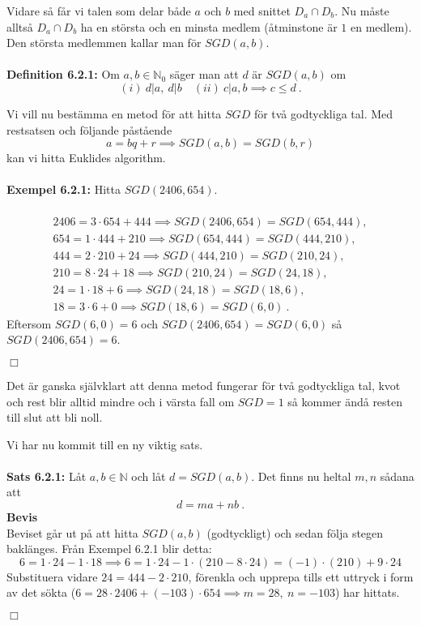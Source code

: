\documentclass{article}
\begin{document}
Vidare så får vi talen som delar både $a$ och $b$ med snittet $D_a\cap D_b$. Nu måste alltså $D_a\cap D_b$ ha en största och en minsta medlem (åtminstone är $1$ en medlem). Den största medlemmen kallar man för $SGD(a,b)$.\\ \\
\textbf{Definition 6.2.1:} Om $a,b\in\mathbb{N}_0$ säger man att $d$ är $SGD(a,b)$ om
$$
(i) \ d|a, \ d|b \quad (ii) \  c|a,b\implies c\leq d \ .
$$

Vi vill nu bestämma en metod för att hitta $SGD$ för två godtyckliga tal. Med restsatsen och följande påstående
$$
a=bq+r\implies SGD(a,b)=SGD(b,r)
$$
kan vi hitta Euklides algorithm.\\ \\
\textbf{Exempel 6.2.1:} Hitta $SGD(2406,654)$.\\ \\
\begin{equation*}
    \begin{split}
        2406=3\cdot654+444 \implies SGD(2406,654)=SGD(654,444), \\
        654=1\cdot444+210 \implies SGD(654,444)=SGD(444,210), \\
        444=2\cdot210+24\implies SGD(444,210)=SGD(210,24), \\
        210=8\cdot24+18 \implies SGD(210,24)=SGD(24,18), \\
        24=1\cdot18+6 \implies SGD(24,18)=SGD(18,6), \\
        18=3\cdot6+0 \implies SGD(18,6)=SGD(6,0)\ .
    \end{split}
\end{equation*}
Eftersom $SGD(6,0)=6$ och $SGD(2406,654)=SGD(6,0)$ så $SGD(2406,654)=6$.
\begin{flushright}
$\Box$
\end{flushright}
Det är ganska självklart att denna metod fungerar för två godtyckliga tal, kvot och rest blir alltid mindre och i värsta fall om $SGD=1$ så kommer ändå resten till slut att bli noll. 

Vi har nu kommit till en ny viktig sats.\\ \\
\textbf{Sats 6.2.1:} Låt $a,b\in\mathbb{N}$ och låt $d=SGD(a,b)$. Det finns nu heltal $m,n$ sådana att
$$
d=ma+nb \ .
$$
\textbf{Bevis}\\
Beviset går ut på att hitta $SGD(a,b)$ (godtyckligt) och sedan följa stegen baklänges. Från Exempel 6.2.1 blir detta:
$$
6=1\cdot24-1\cdot18\implies 6=1\cdot24-1\cdot(210-8\cdot24)=(-1)\cdot(210)+9\cdot24
$$
Substituera vidare $24=444-2\cdot210$, förenkla och upprepa tills ett uttryck i form av det sökta ($6=28\cdot2406+(-103)\cdot654\implies m=28, \ n=-103$) har hittats. 
\begin{flushright}
$\Box$
\end{flushright}
\end{document}
